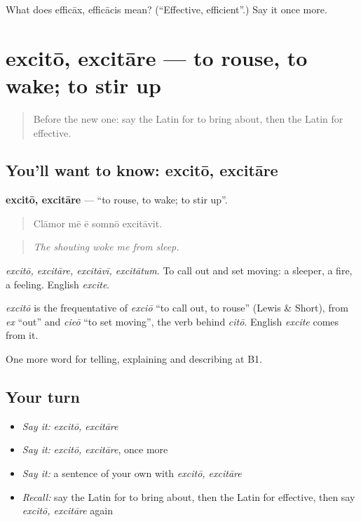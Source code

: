 \begin{tcolorbox}[breakable,colback=teal!4,colframe=teal!35!black,title={Before you move on}]
What does efficāx, efficācis mean? (\textquotedblleft{}Effective, efficient\textquotedblright{}.) Say it once more.
\end{tcolorbox}
\section[excitō, excitāre]{excitō, excitāre — to rouse, to wake; to stir up}

\label{lesson:LA-C372-excito}



\begin{quote}
Before the new one: say the Latin for to bring about, then the Latin for effective.
\end{quote}

\subsection*{You'll want to know: excitō, excitāre}
\textbf{excitō, excitāre} — \textquotedblleft{}to rouse, to wake; to stir up\textquotedblright{}.

\begin{quote}
Clāmor mē ē somnō excitāvit.
\end{quote}

\begin{quote}
\emph{The shouting woke me from sleep.}
\end{quote}

\emph{excitō, excitāre, excitāvī, excitātum}. To call out and set moving: a sleeper, a fire, a feeling. English \emph{excite}.

\begin{cousinweb}
\emph{excitō} is the frequentative of \emph{exciō} \textquotedblleft{}to call out, to rouse\textquotedblright{} (Lewis \& Short), from \emph{ex} \textquotedblleft{}out\textquotedblright{} and \emph{cieō} \textquotedblleft{}to set moving\textquotedblright{}, the verb behind \emph{citō}. English \emph{excite} comes from it.
\end{cousinweb}

\begin{grammarlens}[title={What you've built}]
One more word for telling, explaining and describing at B1.
\end{grammarlens}

\subsection*{Your turn}
\begin{itemize}
\raggedright
  \item \emph{Say it:} \emph{excitō, excitāre}
  \item \emph{Say it:} \emph{excitō, excitāre}, once more
  \item \emph{Say it:} a sentence of your own with \emph{excitō, excitāre}
  \item \emph{Recall:} say the Latin for to bring about, then the Latin for effective, then say \emph{excitō, excitāre} again
\end{itemize}

